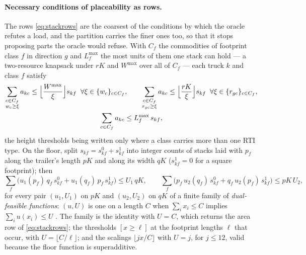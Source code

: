 \paragraph{Necessary conditions of placeability as rows.}
The rows \eqref{eq:stackrows} are the coarsest of the conditions by
which the oracle refutes a load, and the
partition carries the finer ones too, so that it stops proposing parts
the oracle would refuse. With $C_{f}$ the commodities of footprint class $f$ in
direction $g$ and $L^{\max}_{f}$ the most units of them one stack can
hold --- a two-resource knapsack under $rK$ and $W^{\max}$ over all of
$C_{f}$ --- each truck $k$ and class $f$ satisfy
\begin{equation}
\begin{gathered}
\sum_{\substack{c\in C_{f}\\ w_{c}\ge\xi}}a_{kc}\le
  \Bigl\lfloor\frac{W^{\max}}{\xi}\Bigr\rfloor s_{kf}
  \;\;\forall\xi\in\{w_{c}\}_{c\in C_{f}},
\qquad
\sum_{\substack{c\in C_{f}\\ r_{gc}\ge\xi}}a_{kc}\le
  \Bigl\lfloor\frac{rK}{\xi}\Bigr\rfloor s_{kf}
  \;\;\forall\xi\in\{r_{gc}\}_{c\in C_{f}},
\\
\sum_{c\in C_{f}}a_{kc}\le L^{\max}_{f}\,s_{kf},
\end{gathered}
\label{eq:geomrows}
\end{equation}
the height thresholds being written only where a class carries more
than one RTI type. On the floor, split $s_{kf}=s^{0}_{kf}+s^{1}_{kf}$
into integer counts of stacks laid with $p_{f}$ along the trailer's
length $pK$ and along its width $qK$ ($s^{1}_{kf}=0$ for a square
footprint); then
\begin{equation}
\sum_{f}\bigl(u_{1}(p_{f})\,q_{f}\,s^{0}_{kf}+u_{1}(q_{f})\,p_{f}\,s^{1}_{kf}\bigr)
  \le U_{1}\,qK,
\qquad
\sum_{f}\bigl(p_{f}\,u_{2}(q_{f})\,s^{0}_{kf}+q_{f}\,u_{2}(p_{f})\,s^{1}_{kf}\bigr)
  \le pK\,U_{2},
\label{eq:fibrerows}
\end{equation}
for every pair $(u_{1},U_{1})$ on $pK$ and $(u_{2},U_{2})$ on $qK$ of a
finite family of \emph{dual-feasible functions}: $(u,U)$ is one on a
length $C$ when $\sum_{i}x_{i}\le C$ implies $\sum_{i}u(x_{i})\le U$
\autocite{FeketeSchepers2001,Clautiaux2010Survey}. The family is the
identity with $U=C$, which returns the area row of
\eqref{eq:stackrows}; the thresholds $[x\ge\ell]$ at the footprint
lengths $\ell$ that occur, with $U=\lfloor C/\ell\rfloor$; and the
scalings $\lfloor jx/C\rfloor$ with $U=j$, for $j\le12$, valid because
the floor function is superadditive.


